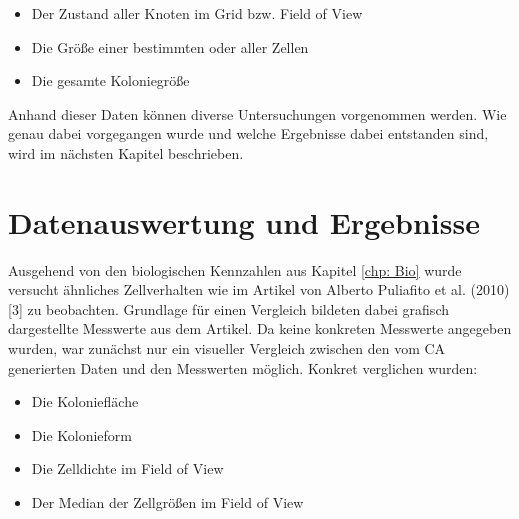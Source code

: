 \documentclass[11pt,a4paper,pointlessnumbers]{scrreprt}  %
\begin{document}
\begin{itemize}
	\item Der Zustand aller Knoten im Grid bzw. Field of View
	\item Die Größe einer bestimmten oder aller Zellen
	\item Die gesamte Koloniegröße
\end{itemize}

Anhand dieser Daten können diverse Untersuchungen vorgenommen werden. Wie genau dabei vorgegangen wurde und welche Ergebnisse dabei entstanden sind, wird im nächsten Kapitel beschrieben.

%

\chapter{Datenauswertung und Ergebnisse}\label{chp: Datenauswertung und Ergebnisse}
Ausgehend von den biologischen Kennzahlen aus Kapitel \ref{chp: Bio} wurde versucht ähnliches Zellverhalten wie im Artikel von Alberto Puliafito et al. (2010) [3] zu beobachten. Grundlage für einen Vergleich bildeten dabei grafisch dargestellte Messwerte aus dem Artikel. Da keine konkreten Messwerte angegeben wurden, war zunächst nur ein visueller Vergleich zwischen den vom CA generierten Daten und den Messwerten möglich. Konkret verglichen wurden:

\begin{itemize}
	\item Die Koloniefläche
	\item Die Kolonieform
	\item Die Zelldichte im Field of View
	\item Der Median der Zellgrößen im Field of View
\end{itemize}
\end{document}
